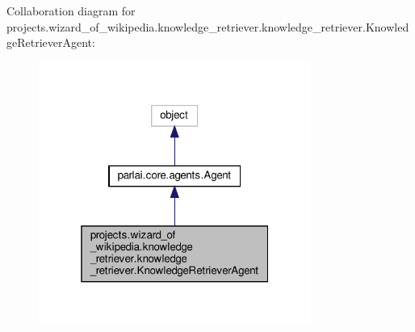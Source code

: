 Collaboration diagram for projects.\+wizard\+\_\+of\+\_\+wikipedia.\+knowledge\+\_\+retriever.\+knowledge\+\_\+retriever.\+Knowledge\+Retriever\+Agent\+:
\nopagebreak
\begin{figure}[H]
\begin{center}
\leavevmode
\includegraphics[width=253pt]{d6/d96/classprojects_1_1wizard__of__wikipedia_1_1knowledge__retriever_1_1knowledge__retriever_1_1KnowledgeRetrieverAgent__coll__graph}
\end{center}
\end{figure}
